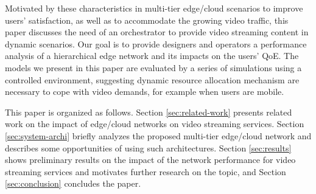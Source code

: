 
Motivated by these characteristics in multi-tier edge/cloud scenarios to improve users' satisfaction, as well as to accommodate the growing video traffic, this paper discusses the need of an orchestrator to provide video streaming content in dynamic scenarios.
Our goal is to provide designers and operators a performance analysis of a hierarchical edge network and its impacts on the users' QoE. The models we present in this paper are evaluated by a series of simulations using a controlled environment, suggesting dynamic resource allocation mechanism are necessary to cope with video demands, for example when users are mobile.

This paper is organized as follows.
Section \ref{sec:related-work} presents related work on the impact of edge/cloud networks on video streaming services.
Section \ref{sec:system-archi} briefly analyzes the proposed multi-tier edge/cloud network and describes some opportunities of using such architectures.
Section \ref{sec:results} shows preliminary results on the impact of the network performance for video streaming services and motivates further research on the topic, and Section \ref{sec:conclusion} concludes the paper.